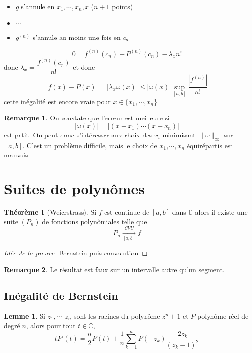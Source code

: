 \documentclass{article}
\theoremstyle{definition}
\newtheorem*{thm}{Théorème}
\newtheorem*{lmm}{Lemme}
\newtheorem*{rem}{Remarque}
\begin{document}
\begin{itemize}
    \item 
$g$ s'annule en $x_1, \cdots, x_n, x$ ($n+1$ points)
\item $\cdots$
\item 
$g^{(n)}$ s'annule au moins une fois en $c_n$
\end{itemize}

\[
    0=f^{(n)}(c_n)-P^{(n)}(c_n)-\lambda_x n!
\]
donc $\lambda_x = \dfrac{f^{(n)}(c_n)}{n!}$ et donc \[
    |f(x)-P(x)|=|\lambda_x\omega (x)|\leq |\omega(x)|\sup_{[a, b]}\frac{|f^{(n)}|}{n!}
\]
cette inégalité est encore vraie pour $x\in\{x_1, \cdots, x_n\}$

\begin{rem}
On constate que l'erreur est meilleure si \[
    |\omega(x)|=|(x-x_1)\cdots (x-x_n)|
\]
est petit. On peut donc s'intéresser aux choix des $x_i$ minimisant $\|\omega\|_\infty$ sur $[a, b]$. C'est un problème difficile, mais le choix de $x_1, \cdots, x_n$ équirépartis est mauvais.
\end{rem}

\section{Suites de polynômes}

\begin{thm}[Weierstrass]
    Si $f$ est continue de $[a, b]$ dans $\mathbb C$ alors il existe une suite $(P_n)$ de fonctions polynômiales telle que \[
        P_n\xrightarrow[{[a, b]}]{CVU} f
    \]
\end{thm}

\begin{proof}[Idée de la preuve]
    Bernstein puis convolution
\end{proof}

\begin{rem}
Le résultat est faux sur un intervalle autre qu'un segment.
\end{rem}

\subsection{Inégalité de Bernstein}

\begin{lmm}
Si $z_1, \cdots, z_n$ sont les racines du polynôme $z^n+1$ et $P$ polynôme réel de degré $n$, alors pour tout $t\in\mathbb C$, \[
    tP'(t)=\frac n2P(t)+\frac 1n\sum_{k=1}^nP(-z_k)\frac{2z_k}{(z_k-1)^2}
\]
\end{lmm}
\end{document}
